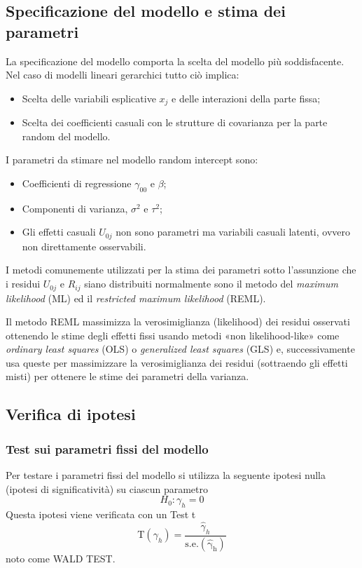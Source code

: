 \documentclass[a4page, 11pt]{article} %
\begin{document}
\subsection*{Specificazione del modello e stima dei parametri}
La specificazione del modello comporta la scelta del modello più soddisfacente. Nel caso di modelli lineari gerarchici tutto ciò implica:
\begin{itemize}
\item Scelta delle variabili esplicative $x_j$ e delle interazioni della parte fissa;
\item Scelta dei coefficienti casuali con le strutture di covarianza per la parte random del modello.
\end{itemize}
I parametri da stimare nel modello random intercept sono:
\begin{itemize}
\item Coefficienti di regressione $\gamma_{00}$ e $\beta$;
\item Componenti di varianza, $\sigma^2$ e $\tau^2$; 
\item Gli effetti casuali $U_{0j}$ non sono parametri ma variabili casuali latenti, ovvero non direttamente osservabili. 
\end{itemize}
I metodi comunemente utilizzati per la stima dei parametri sotto l’assunzione che i residui $U_{0j}$ e $R_{ij}$ siano distribuiti normalmente sono il metodo del \textit{maximum likelihood} (ML) ed il \textit{restricted maximum likelihood} (REML).

Il metodo REML massimizza la verosimiglianza (likelihood) dei residui osservati ottenendo le stime degli effetti fissi usando metodi «non likelihood-like» come \textit{ordinary least squares} (OLS) o \textit{generalized least squares} (GLS) e, successivamente usa queste per massimizzare la verosimiglianza dei residui (sottraendo gli effetti misti) per ottenere le stime dei parametri della varianza.
\subsection*{Verifica di ipotesi}
\subsubsection*{Test sui parametri fissi del modello}
Per testare i parametri fissi del modello si utilizza la seguente ipotesi nulla (ipotesi di significatività) su ciascun parametro 
\begin{equation*}
H_0: \gamma_h = 0
\end{equation*}
\newline
Questa ipotesi viene verificata con un Test t
\begin{equation*}
\mathrm{T}(\gamma_h) = \frac{\hat{\gamma}_h}{\mathrm{s.e.(\hat{\gamma}_h)}}
\end{equation*}
noto come WALD TEST. 
\end{document}
